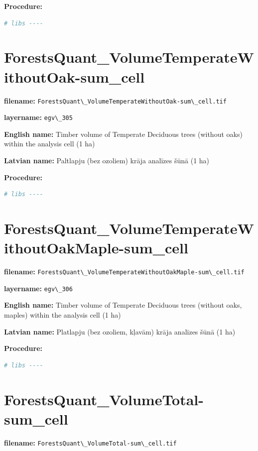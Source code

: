 \documentclass[
]{book}
\newcommand{\passthrough}[1]{#1}
\begin{document}
\textbf{Procedure:}

\begin{lstlisting}[language=R]
# libs ----
\end{lstlisting}

\section{ForestsQuant\_VolumeTemperateWithoutOak-sum\_cell}\label{ch06.305}

\textbf{filename:} \passthrough{\lstinline!ForestsQuant\_VolumeTemperateWithoutOak-sum\_cell.tif!}

\textbf{layername:} \passthrough{\lstinline!egv\_305!}

\textbf{English name:} Timber volume of Temperate Deciduous trees (without oaks) within the analysis cell (1 ha)

\textbf{Latvian name:} Paltlapju (bez ozoliem) krāja analīzes šūnā (1 ha)

\textbf{Procedure:}

\begin{lstlisting}[language=R]
# libs ----
\end{lstlisting}

\section{ForestsQuant\_VolumeTemperateWithoutOakMaple-sum\_cell}\label{ch06.306}

\textbf{filename:} \passthrough{\lstinline!ForestsQuant\_VolumeTemperateWithoutOakMaple-sum\_cell.tif!}

\textbf{layername:} \passthrough{\lstinline!egv\_306!}

\textbf{English name:} Timber volume of Temperate Deciduous trees (without oaks, maples) within the analysis cell (1 ha)

\textbf{Latvian name:} Platlapju (bez ozoliem, kļavām) krāja analīzes šūnā (1 ha)

\textbf{Procedure:}

\begin{lstlisting}[language=R]
# libs ----
\end{lstlisting}

\section{ForestsQuant\_VolumeTotal-sum\_cell}\label{ch06.307}

\textbf{filename:} \passthrough{\lstinline!ForestsQuant\_VolumeTotal-sum\_cell.tif!}
\end{document}
